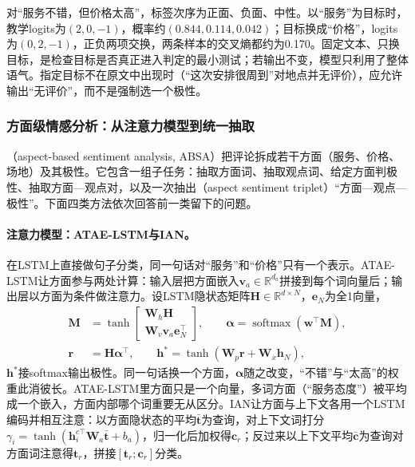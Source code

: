 对“服务不错，但价格太高”，标签次序为正面、负面、中性。以“服务”为目标时，教学logits为$(2,0,-1)$，概率约$(0.844,0.114,0.042)$；目标换成“价格”，logits为$(0,2,-1)$，正负两项交换，两条样本的交叉熵都约为0.170。固定文本、只换目标，是检查目标是否真正进入判定的最小测试；若输出不变，模型只利用了整体语气。指定目标不在原文中出现时（“这次安排很周到”对地点并无评价），应允许输出“无评价”，而不是强制选一个极性。

\subsubsection{方面级情感分析：从注意力模型到统一抽取}
\label{sec:nlp-classification-aspect-opinion}

（aspect-based sentiment analysis, ABSA）把评论拆成若干方面（服务、价格、场地）及其极性。它包含一组子任务：抽取方面词、抽取观点词、给定方面判极性、抽取方面—观点对，以及一次抽出（aspect sentiment triplet）“方面—观点—极性”。下面四类方法依次回答前一类留下的问题。

\paragraph{注意力模型：ATAE-LSTM与IAN。}在LSTM上直接做句子分类，同一句话对“服务”和“价格”只有一个表示。ATAE-LSTM让方面参与两处计算\cite{nlp-wang2016atae}：输入层把方面嵌入$\bm v_a\in\mathbb R^{d_a}$拼接到每个词向量后；输出层以方面为条件做注意力。设LSTM隐状态矩阵$\bm H\in\mathbb R^{d\times N}$，$\bm e_N$为全1向量，
\[
  \begin{aligned}
    \bm M&=\tanh\!\begin{bmatrix}\bm W_h\bm H\\ \bm W_v\bm v_a\bm e_N^\top\end{bmatrix},\qquad
    \bm\alpha=\operatorname{softmax}(\bm w^\top\bm M),\\
    \bm r&=\bm H\bm\alpha^\top,\qquad
    \bm h^*=\tanh(\bm W_p\bm r+\bm W_x\bm h_N),
  \end{aligned}
\]
$\bm h^*$接softmax输出极性。同一句话换一个方面，$\bm\alpha$随之改变，“不错”与“太高”的权重此消彼长。ATAE-LSTM里方面只是一个向量，多词方面（“服务态度”）被平均成一个嵌入，方面内部哪个词重要无从区分。IAN让方面与上下文各用一个LSTM编码并相互注意\cite{nlp-ma2017ian}：以方面隐状态的平均$\bar{\bm t}$为查询，对上下文词打分$\gamma_i=\tanh(\bm h^{c\top}_i\bm W_a\bar{\bm t}+b_a)$，归一化后加权得$\bm c_r$；反过来以上下文平均$\bar{\bm c}$为查询对方面词注意得$\bm t_r$，拼接$[\bm t_r;\bm c_r]$分类。

